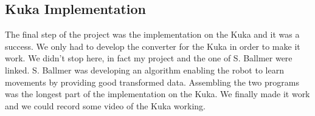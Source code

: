 \subsection{Kuka Implementation}
The final step of the project was the implementation on the Kuka and it was a success. We only had to develop the converter for the Kuka in order to make it work.
We didn't stop here, in fact my project and the one of S. Ballmer were linked. S. Ballmer was developing an algorithm enabling the robot to learn movements by providing good transformed data. Assembling the two programs was the longest part of the implementation on the Kuka.
We finally made it work and we could record some video of the Kuka working.